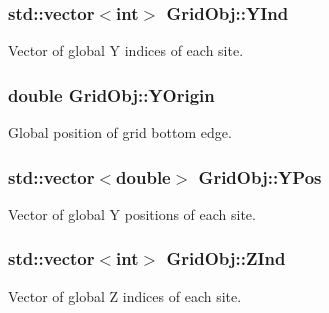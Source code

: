 \subsubsection[{\texorpdfstring{Y\+Ind}{YInd}}]{\setlength{\rightskip}{0pt plus 5cm}std\+::vector$<$int$>$ Grid\+Obj\+::\+Y\+Ind}\hypertarget{class_grid_obj_acf1d07b290887f0d380d046a1d698f0e}{}\label{class_grid_obj_acf1d07b290887f0d380d046a1d698f0e}


Vector of global Y indices of each site. 

\subsubsection[{\texorpdfstring{Y\+Origin}{YOrigin}}]{\setlength{\rightskip}{0pt plus 5cm}double Grid\+Obj\+::\+Y\+Origin}\hypertarget{class_grid_obj_a30c070fe26def1366db2b3e66b3cd29d}{}\label{class_grid_obj_a30c070fe26def1366db2b3e66b3cd29d}


Global position of grid bottom edge. 

\subsubsection[{\texorpdfstring{Y\+Pos}{YPos}}]{\setlength{\rightskip}{0pt plus 5cm}std\+::vector$<$double$>$ Grid\+Obj\+::\+Y\+Pos}\hypertarget{class_grid_obj_a2bd4e9b575377b8e76e5ebe7a3a31194}{}\label{class_grid_obj_a2bd4e9b575377b8e76e5ebe7a3a31194}


Vector of global Y positions of each site. 

\subsubsection[{\texorpdfstring{Z\+Ind}{ZInd}}]{\setlength{\rightskip}{0pt plus 5cm}std\+::vector$<$int$>$ Grid\+Obj\+::\+Z\+Ind}\hypertarget{class_grid_obj_aef85a27cb2bca6b268469ee96470bb35}{}\label{class_grid_obj_aef85a27cb2bca6b268469ee96470bb35}


Vector of global Z indices of each site. 


